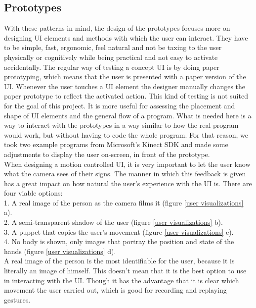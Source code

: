 \subsection{Prototypes}

With these patterns in mind, the design of the prototypes focuses more on designing UI elements and methods with which the user can interact. They have to be simple, fast, ergonomic, feel natural and not be taxing to the user physically or cognitively while being practical and not easy to activate accidentally. The regular way of testing a concept UI is by doing paper prototyping, which means that the user is presented with a paper version of the UI. Whenever the user touches a UI element the designer manually changes the paper prototype to reflect the activated action. This kind of testing is not suited for the goal of this project. It is more useful for assessing the placement and shape of UI elements and the general flow of a program. What is needed here is a way to interact with the prototypes in a way similar to how the real program would work, but without having to code the whole program. For that reason, we took two example programs from Microsoft's Kinect SDK and made some adjustments to display the user on-screen, in front of the prototype.\\

When designing a motion controlled UI, it is very important to let the user know what the camera sees of their signs. The manner in which this feedback is given has a great impact on how natural the user's experience with the UI is. There are four viable options:\\

 1. A real image of the person as the camera films it (figure \ref{user visualizations} a).\\
 2. A semi-transparent shadow of the user (figure \ref{user visualizations} b).\\
 3. A puppet that copies the user's movement (figure \ref{user visualizations} c).\\
 4. No body is shown, only images that portray the position and state of the hands (figure \ref{user visualizations} d).\\

A real image of the person is the most identifiable for the user, because it is literally an image of himself. This doesn't mean that it is the best option to use in interacting with the UI. Though it has the advantage that it is clear which movement the user carried out, which is good for recording and replaying gestures.\\
 
